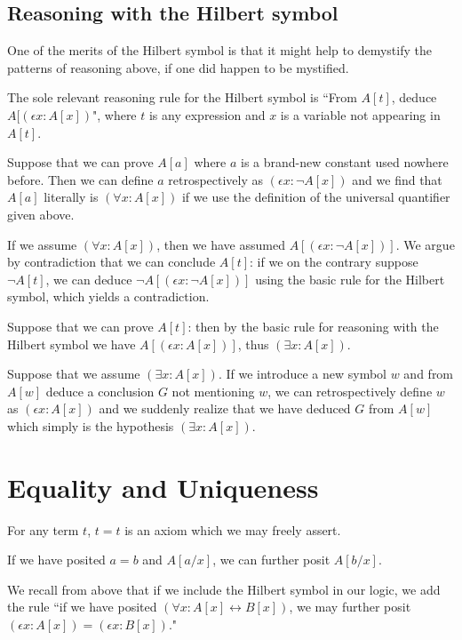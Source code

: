 \documentclass[12pt]{book}
\begin{document}
\subsection{Reasoning with the Hilbert symbol}

One of the merits of the Hilbert symbol is that it might help to demystify the patterns of reasoning above, if one did happen to be mystified.

The sole relevant reasoning rule for the Hilbert symbol is ``From $A[t]$, deduce $A[(\epsilon x:A[x])$", where $t$ is any expression and $x$ is a variable not appearing in $A[t]$.

Suppose that we can prove $A[a]$ where $a$ is a brand-new constant used nowhere before.  Then we can define $a$ retrospectively
as $(\epsilon x:\neg A[x])$ and we find that $A[a]$ literally is $(\forall x:A[x])$ if we use the definition of the universal quantifier given above.

If we assume $(\forall x:A[x])$, then we have assumed $A[(\epsilon x:\neg A[x])]$.  We argue by contradiction that we can conclude $A[t]$:  if we on the contrary suppose $\neg A[t]$, we can deduce $\neg A[(\epsilon x:\neg A[x])]$ using the basic rule for the Hilbert symbol, which yields a contradiction.

Suppose that we can prove $A[t]$:  then by the basic rule for reasoning with the Hilbert symbol we have $A[(\epsilon x:A[x])]$, thus $(\exists x:A[x])$.

Suppose that we assume $(\exists x:A[x])$.  If we introduce a new symbol $w$ and from $A[w]$ deduce a conclusion $G$ not mentioning $w$, we
can retrospectively define $w$ as $(\epsilon x:A[x])$ and we suddenly realize that we have deduced $G$ from $A[w]$ which simply is the hypothesis
$(\exists x:A[x])$.



\section{Equality and Uniqueness}

For any term $t$, $t=t$ is an axiom which we may freely assert.

If we have posited $a=b$ and $A[a/x]$, we can further posit $A[b/x]$.

We recall from above that if we include the Hilbert symbol in our logic, we add the rule ``if we have posited $(\forall x:A[x] \leftrightarrow B[x])$, we may further posit $(\epsilon x:A[x]) = (\epsilon x:B[x])$."
\end{document}
